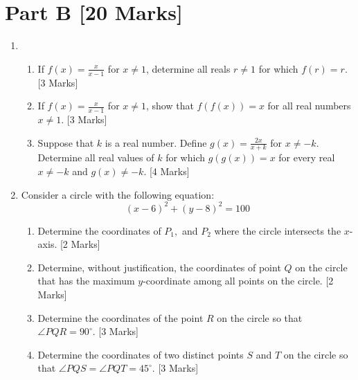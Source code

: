 \documentclass[12pt]{article}
\begin{document}
\section*{Part B [20 Marks]}
\begin{enumerate}
    \item 
    \begin{enumerate}
        \item If $f(x) = \displaystyle{\frac{x}{x - 1}}$ for $x \neq 1$, determine all reals $r \neq 1$ for which $f(r) = r$.  [3 Marks]
        \item If $f(x) = \displaystyle{\frac{x}{x - 1}}$ for $x \neq 1$, show that $f(f(x)) = x$ for all real numbers $x \neq 1$. [3 Marks]
        \item Suppose that $k$ is a real number. Define $g(x) = \displaystyle{\frac{2x}{x + k}}$ for $x \neq -k$. Determine all real values of $k$ for which $g(g(x)) = x$ for every real $x \neq -k$ and $g(x) \neq -k$. [4 Marks]
    \end{enumerate} \newpage

    \item Consider a circle with the following equation:
    \begin{equation*}
        (x - 6)^2 + (y - 8)^2 = 100
    \end{equation*}
    \begin{enumerate}
        \item Determine the coordinates of $P_1, $ and $P_2$ where the circle intersects the $x$-axis. [2 Marks]
        \item Determine, without justification, the coordinates of point $Q$ on the circle that has the maximum $y$-coordinate among all points on the circle. [2 Marks]
        \item Determine the coordinates of the point $R$ on the circle so that $\angle PQR = 90^{\circ}$. [3 Marks]
        \item Determine the coordinates of two distinct points $S$ and $T$ on the circle so that $\angle PQS = \angle PQT = 45^{\circ}$. [3 Marks]
    \end{enumerate}
\end{enumerate}
\end{document}
